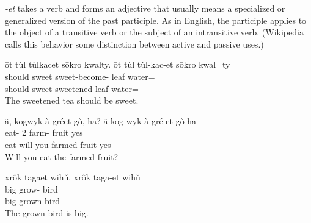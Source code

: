 \textit{-et} takes a verb and forms an adjective that
usually means a specialized or generalized version of the past participle.
As in English, the participle applies to the object of a transitive verb
or the subject of an intransitive verb.
(Wikipedia calls this behavior some distinction between active and passive uses.)

\begin{exe}
    \ex
    ōt tùl tùlkacet sōkro kwalty.
    \glll
    ōt tùl tùl-kac-et sōkro kwal=ty \\
    should sweet sweet-become-\Ptcp{} leaf water=\Poss{} \\
    should sweet sweetened leaf water=\Poss{} \\
    \glt
    The sweetened tea should be sweet.
\end{exe}

\begin{exe}
    \ex
    ã, kōgwyk à gréet gò, ha?
    \glll
    ã kōg-wyk à gré-et gò ha \\
    \Q{} eat-\Fut{} 2\Sg{} farm-\Ptcp{} fruit yes \\
    \Q{} eat-will you farmed fruit yes \\
    \glt
    Will you eat the farmed fruit?
\end{exe}

\begin{exe}
    \ex
    xrôk tāgaet wihǔ.
    \glll
    xrôk tāga-et wihǔ \\
    big grow-\Ptcp{} bird \\
    big grown bird \\
    \glt
    The grown bird is big.
\end{exe}